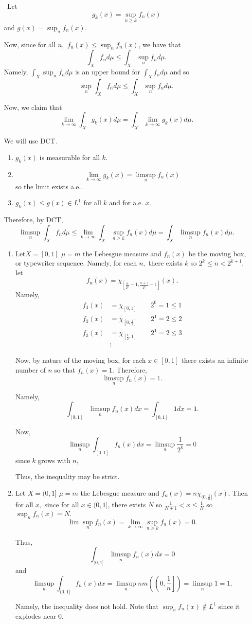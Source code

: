 \documentclass[12pt]{Homework}
\begin{document}
\begin{solution}$\,$
Let $$g_k(x)=\sup_{n\ge k}f_n(x)$$ and $g(x)=\sup_nf_n(x)$. 

Now, since for all $n,$ $f_n(x)\le\sup_nf_n(x)$, we have that $$\int_Xf_nd\mu\le\int_X\sup_nf_nd\mu.$$ Namely, $\displaystyle \int_X\sup_nf_nd\mu$ is an upper bound for $\displaystyle \int_Xf_nd\mu$ and so $$\sup_n\int_Xf_nd\mu\le \int_X\sup_nf_nd\mu.$$

Now, we claim that $$\lim_{k\to\infty}\int_Xg_k(x)d\mu=\int_X\lim_{k\to\infty}g_k(x)d\mu.$$

We will use DCT. \begin{enumerate}
    \item $g_k(x)$ is measurable for all $k.$
    \item $$\lim_{k\to\infty}g_k(x)=\limsup_nf_n(x)$$ so the limit exists a.e..
    \item $g_k(x)\le g(x)\in L^1$ for all $k$ and for a.e. $x$.
\end{enumerate}

Therefore, by DCT, $$\limsup_n\int_Xf_nd\mu\le\lim_{k\to\infty}\int_X\sup_{n\ge k}f_n(x)d\mu=\int_X\limsup_nf_n(x)d\mu.$$

\begin{enumerate}[label=(\alph*)]
    \item Let$X=[0,1]$ $\mu=m$ the Lebesgue measure and $f_n(x)$ be the moving box, or typewriter sequence. Namely, for each $n,$ there exists $k$ so $2^k\le n<2^{k+1}$, let $$f_n(x)=\chi_{[\frac{n}{2^k}-1,\frac{n+1}{2^k}-1]}(x).$$ Namely, \begin{align*}
        f_1(x)&=\chi_{[0,1]}\qquad 2^0=1\le 1\\
        f_2(x)&=\chi_{[0,\frac{1}{2}]}\qquad 2^1=2\le 2\\
        f_3(x)&=\chi_{[\frac{1}{2},1]}\qquad 2^1=2\le 3\\
        &\vdots
    \end{align*}
    
    Now, by nature of the moving box, for each $x\in[0,1]$ there exists an infinite number of $n$ so that $f_n(x)=1$. Therefore, $$\limsup_nf_n(x)=1.$$ 
    
    Namely, $$\int_{[0,1]}\limsup_nf_n(x)dx=\int_{[0,1]}1dx=1.$$
    
    Now, $$\limsup_n\int_{[0,1]}f_n(x)dx=\limsup_n\frac{1}{2^k}=0$$ since $k$ grows with $n,$
    
    Thus, the inequality may be strict.
    \item Let $X=(0,1]$ $\mu=m$ the Lebesgue measure and $f_n(x)=n\chi_{(0,\frac{1}{n}]}(x)$. Then for all $x,$ since for all $x\in(0,1]$, there exists $N$ so $\frac{1}{N+1}< x\le \frac{1}{N}$ so $\sup_nf_n(x)=N.$ $$\lim\sup_nf_n(x)=\lim_{k\to\infty}\sup_{n\ge k}f_n(x)=0.$$
    
    Thus, $$\int_{(0,1]}\limsup_nf_n(x)dx=0$$ and $$\limsup_n\int_{(0,1]}f_n(x)dx=\limsup_nnm\left(\left(0,\frac{1}{n}\right]\right)=\limsup_n1=1.$$
    
    Namely, the inequality does not hold. Note that $\sup_nf_n(x)\notin L^1$ since it explodes near $0$.
\end{enumerate}
\end{solution}
\vspace{0.5cm}
\end{document}
